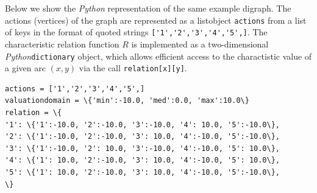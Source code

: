 \documentclass{article}
\newcommand{\+}{\verb+}
\renewcommand{\*}{\back{}}
\newcommand{\Py}{\emph{Python}\xspace }
\begin{document}
\begin{center}
Below we show the \Py representation of the same example digraph. The actions (vertices) of the graph are represented  as a listobject \+actions+ from a list of keys in the format of quoted strings \+['1','2','3','4','5',]+. The characteristic relation function $R$ is implemented as a two-dimensional \Py \+dictionary+ object, which allows efficient access to the charactistic value of a given arc $(x,y)$ via the call \+relation[x][y]+. 
\begin{example}
\begin{verbatim}
actions = ['1','2','3','4','5',]
valuationdomain = \{'min':-10.0, 'med':0.0, 'max':10.0\}
relation = \{
'1': \{'1':-10.0, '2':-10.0, '3':-10.0, '4': 10.0, '5':-10.0\},
'2': \{'1':-10.0, '2':-10.0, '3': 10.0, '4':-10.0, '5':-10.0\},
'3': \{'1':-10.0, '2': 10.0, '3':-10.0, '4':-10.0, '5': 10.0\},
'4': \{'1': 10.0, '2':-10.0, '3': 10.0, '4':-10.0, '5': 10.0\},
'5': \{'1': 10.0, '2':-10.0, '3': 10.0, '4':-10.0, '5':-10.0\},
\}
\end{verbatim}
\end{example}


\end{center}
\end{document}
